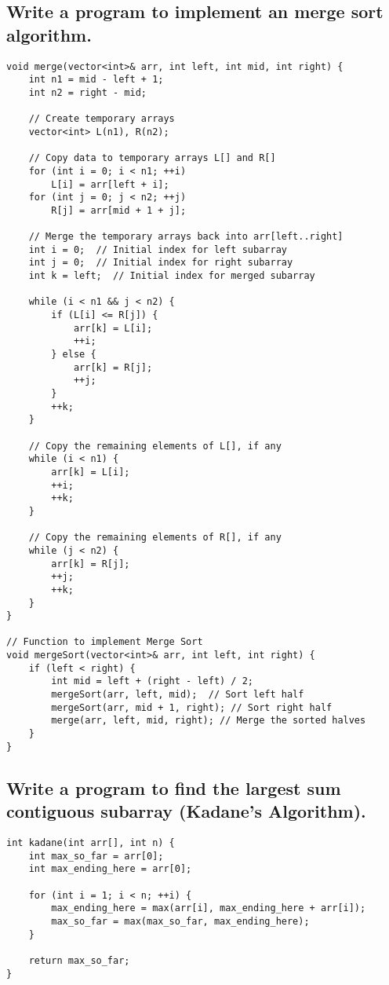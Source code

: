 \subsection{Write a program to implement an merge sort algorithm.}
\begin{tcolorbox}[title=]
\begin{verbatim}
void merge(vector<int>& arr, int left, int mid, int right) {
    int n1 = mid - left + 1;
    int n2 = right - mid;

    // Create temporary arrays
    vector<int> L(n1), R(n2);

    // Copy data to temporary arrays L[] and R[]
    for (int i = 0; i < n1; ++i)
        L[i] = arr[left + i];
    for (int j = 0; j < n2; ++j)
        R[j] = arr[mid + 1 + j];

    // Merge the temporary arrays back into arr[left..right]
    int i = 0;  // Initial index for left subarray
    int j = 0;  // Initial index for right subarray
    int k = left;  // Initial index for merged subarray

    while (i < n1 && j < n2) {
        if (L[i] <= R[j]) {
            arr[k] = L[i];
            ++i;
        } else {
            arr[k] = R[j];
            ++j;
        }
        ++k;
    }

    // Copy the remaining elements of L[], if any
    while (i < n1) {
        arr[k] = L[i];
        ++i;
        ++k;
    }

    // Copy the remaining elements of R[], if any
    while (j < n2) {
        arr[k] = R[j];
        ++j;
        ++k;
    }
}

// Function to implement Merge Sort
void mergeSort(vector<int>& arr, int left, int right) {
    if (left < right) {
        int mid = left + (right - left) / 2; 
        mergeSort(arr, left, mid);  // Sort left half
        mergeSort(arr, mid + 1, right); // Sort right half
        merge(arr, left, mid, right); // Merge the sorted halves
    }
}
\end{verbatim}
\end{tcolorbox}

\subsection{Write a program to find the largest sum contiguous subarray (Kadane’s Algorithm).}
\begin{tcolorbox}[title=]
\begin{verbatim}
int kadane(int arr[], int n) {
    int max_so_far = arr[0];
    int max_ending_here = arr[0];

    for (int i = 1; i < n; ++i) {
        max_ending_here = max(arr[i], max_ending_here + arr[i]);
        max_so_far = max(max_so_far, max_ending_here);
    }

    return max_so_far;
}
\end{verbatim}
\end{tcolorbox}
